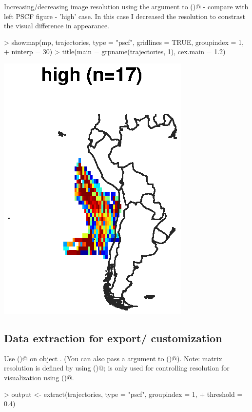 \documentclass{article}
\renewenvironment{Schunk}{\vspace{\topsep}}{\vspace{\topsep}}
\begin{document}
Increasing/decreasing image resolution using the \verb@ninterp@
argument to \verb@showmap()@ - compare with left PSCF figure - 'high'
case. In this case I decreased the resolution to constrast the visual
difference in appearance.
\begin{Schunk}
\begin{Sinput}
> showmap(mp, trajectories, type = "pscf", gridlines = TRUE, groupindex = 1, 
+     ninterp = 30)
> title(main = grpname(trajectories, 1), cex.main = 1.2)
\end{Sinput}
\end{Schunk}
\includegraphics{figures/fig-024}

\subsection{Data extraction for export/ customization}

Use \verb@extract()@ on object \verb@trajectories@. (You can also pass
a \verb@threshold@ argument to \verb@extract()@). Note: matrix
resolution is defined by \verb@xygrid@ using \verb@definegrid()@;
\verb@ninterp@ is only used for controlling resolution for
visualization using \verb@showmap()@.
\begin{Schunk}
\begin{Sinput}
> output <- extract(trajectories, type = "pscf", groupindex = 1, 
+     threshold = 0.4)
\end{Sinput}
\end{Schunk}
\end{document}

